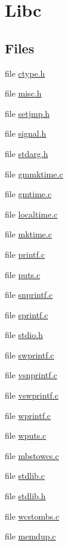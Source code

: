 \hypertarget{group__libc}{\section{Libc}
\label{group__libc}
}
\subsection*{Files}
\begin{DoxyCompactItemize}
\item 
file \hyperlink{ctype_8h}{ctype.\-h}
\item 
file \hyperlink{misc_8h}{misc.\-h}
\item 
file \hyperlink{setjmp_8h}{setjmp.\-h}
\item 
file \hyperlink{signal_8h}{signal.\-h}
\item 
file \hyperlink{stdarg_8h}{stdarg.\-h}
\item 
file \hyperlink{gmmktime_8c}{gmmktime.\-c}
\item 
file \hyperlink{gmtime_8c}{gmtime.\-c}
\item 
file \hyperlink{localtime_8c}{localtime.\-c}
\item 
file \hyperlink{mktime_8c}{mktime.\-c}
\item 
file \hyperlink{printf_8c}{printf.\-c}
\item 
file \hyperlink{puts_8c}{puts.\-c}
\item 
file \hyperlink{snprintf_8c}{snprintf.\-c}
\item 
file \hyperlink{sprintf_8c}{sprintf.\-c}
\item 
file \hyperlink{stdio_8h}{stdio.\-h}
\item 
file \hyperlink{swprintf_8c}{swprintf.\-c}
\item 
file \hyperlink{vsnprintf_8c}{vsnprintf.\-c}
\item 
file \hyperlink{vswprintf_8c}{vswprintf.\-c}
\item 
file \hyperlink{wprintf_8c}{wprintf.\-c}
\item 
file \hyperlink{wputs_8c}{wputs.\-c}
\item 
file \hyperlink{mbstowcs_8c}{mbstowcs.\-c}
\item 
file \hyperlink{stdlib_8c}{stdlib.\-c}
\item 
file \hyperlink{stdlib_8h}{stdlib.\-h}
\item 
file \hyperlink{wcstombs_8c}{wcstombs.\-c}
\item 
file \hyperlink{memdup_8c}{memdup.\-c}
\item 

\end{DoxyCompactItemize}
